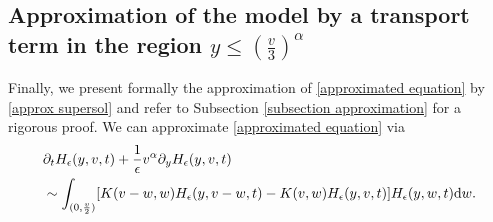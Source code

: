 \documentclass[11pt]{article}
\numberwithin{equation}{section}
\newcommand{\der}{\textup{d}}
\begin{document}
\subsection{Approximation of the model by a transport term in the region $y\leq (\frac{v}{3})^{\alpha}$}\label{approx formal subsection}
Finally, we present formally the approximation of \eqref{approximated equation} by \eqref{approx supersol} and refer to Subsection \ref{subsection approximation} for a rigorous proof. We can approximate \eqref{approximated equation}  via 
\begin{align}
&\partial_{t}H_{\epsilon}(y,v,t)+\frac{1}{\epsilon}v^{\alpha}\partial_{y}H_{\epsilon}(y,v,t) \nonumber\\
    &\sim\int_{(0,\frac{v}{2})}[K(v-w,w)H_{\epsilon}(y,v-w,t)-K(v,w)H_{\epsilon}(y,v,t)]H_{\epsilon}(y,w,t)\der w\label{first part approximation formal}.
    \end{align}
\end{document}
